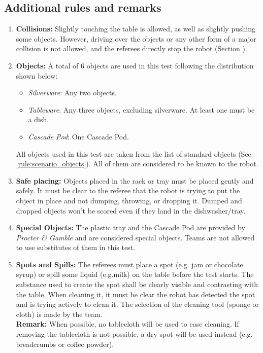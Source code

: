 \subsection{Additional rules and remarks}
\begin{enumerate}
	\item \textbf{Collisions:} Slightly touching the table is allowed, as well as slightly pushing some objects. However, driving over the objects or any other form of a major collision is not allowed, and the referees directly stop the robot (Section ).

	\item \textbf{Objects:} A total of 6 objects are used in this test following the distribution shown below:
	\begin{itemize}
		\item\textit{Silverware}: Any two objects.
		\item\textit{Tableware}: Any three objects, excluding silverware. At least one must be a dish.
		\item\textit{Cascade Pod}: One Cascade Pod.
	\end{itemize}
	All objects used in this test are taken from the list of standard objects (See \ref{rule:scenario_objects}). All of them are considered to be known to the robot.

	\item \textbf{Safe placing:} Objects placed in the rack or tray must be placed gently and safely. It must be clear to the referee that the robot is trying to put the object in place and not dumping, throwing, or dropping it. Dumped and dropped objects won't be scored even if they land in the dishwasher/tray.

	\item \textbf{Special Objects:} The plastic tray and the Cascade Pod are provided by \textit{Procter \& Gamble} and are considered special objects. Teams are not allowed to use substitutes of them in this test.

	\item \textbf{Spots and Spills:} The referees must place a spot (e.g. jam or chocolate syrup) or spill some liquid (e.g.milk) on the table before the test starts. The substance used to create the spot shall be clearly visible and contrasting with the table. When cleaning it, it must be clear the robot has detected the spot and is trying actively to clean it. The selection of the cleaning tool (sponge or cloth) is made by the team.\\
	\textbf{Remark:} When possible, no tablecloth will be used to ease cleaning. If removing the tablecloth is not possible, a dry spot will be used instead (e.g. breadcrumbs or coffee powder).


\end{enumerate}

